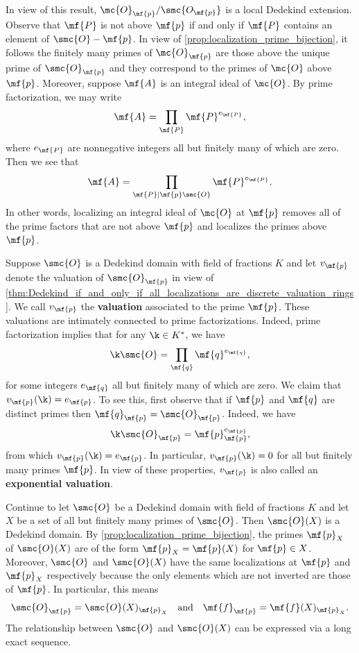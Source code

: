 \documentclass[12pt]{article}
\begin{document}
      In view of this result, \(\mc{O}_{\mf{p}}/\smc{O_{\mf{p}}}\) is a local Dedekind extension. Observe that \(\mf{P}\) is not above \(\mf{p}\) if and only if \(\mf{P}\) contains an element of \(\smc{O}-\mf{p}\). In view of \cref{prop:localization_prime_bijection}, it follows the finitely many primes of \(\mc{O}_{\mf{p}}\) are those above the unique prime of \(\smc{O}_{\mf{p}}\) and they correspond to the primes of \(\mc{O}\) above \(\mf{p}\). Moreover, suppose \(\mf{A}\) is an integral ideal of \(\mc{O}\). By prime factorization, we may write
      \[
        \mf{A} = \prod_{\mf{P}}\mf{P}^{e_{\mf{P}}},
      \]
      where \(e_{\mf{P}}\) are nonnegative integers all but finitely many of which are zero. Then we see that
      \[
        \mf{A} = \prod_{\mf{P} \mid \mf{p}\smc{O}}\mf{P}^{e_{\mf{P}}}.
      \]
      In other words, localizing an integral ideal of \(\mc{O}\) at \(\mf{p}\) removes all of the prime factors that are not above \(\mf{p}\) and localizes the primes above \(\mf{p}\).

      Suppose \(\smc{O}\) is a Dedekind domain with field of fractions \(K\) and let \(v_{\mf{p}}\) denote the valuation of \(\smc{O}_{\mf{p}}\) in view of \cref{thm:Dedekind_if_and_only_if_all_localizations_are_discrete_valuation_rings}. We call \(v_{\mf{p}}\) the \textbf{valuation} associated to the prime \(\mf{p}\). These valuations are intimately connected to prime factorizations. Indeed, prime factorization implies that for any \(\k \in K^{\ast}\), we have
      \[
        \k\smc{O} = \prod_{\mf{q}}\mf{q}^{e_{\mf{q}}},
      \]
      for some integers \(e_{\mf{q}}\) all but finitely many of which are zero. We claim that \(v_{\mf{p}}(\k) = e_{\mf{p}}\). To see this, first observe that if \(\mf{p}\) and \(\mf{q}\) are distinct primes then \(\mf{q}_{\mf{p}} = \smc{O}_{\mf{p}}\). Indeed, we have
      \[
        \k\smc{O}_{\mf{p}} = \mf{p}_{\mf{p}}^{e_{\mf{p}}},
      \]
      from which \(v_{\mf{p}}(\k) = e_{\mf{p}}\). In particular, \(v_{\mf{p}}(\k) = 0\) for all but finitely many primes \(\mf{p}\). In view of these properties, \(v_{\mf{p}}\) is also called an \textbf{exponential valuation}.

      Continue to let \(\smc{O}\) be a Dedekind domain with field of fractions \(K\) and let \(X\) be a set of all but finitely many primes of \(\smc{O}\). Then \(\smc{O}(X)\) is a Dedekind domain. By \cref{prop:localization_prime_bijection}, the primes \(\mf{p}_{X}\) of \(\smc{O}(X)\) are of the form \(\mf{p}_{X} = \mf{p}(X)\) for \(\mf{p} \in X\). Moreover, \(\smc{O}\) and \(\smc{O}(X)\) have the same localizations at \(\mf{p}\) and \(\mf{p}_{X}\) respectively because the only elements which are not inverted are those of \(\mf{p}\). In particular, this means
      \begin{equation}\label{equ:localizing_at_primes_for_X_is_the_same_as_localizing_at_primes} 
        \smc{O}_{\mf{p}} = \smc{O}(X)_{\mf{p}_{X}} \quad \text{and} \quad \mf{f}_{\mf{p}} = \mf{f}(X)_{\mf{p}_{X}}.
      \end{equation}
      The relationship between \(\smc{O}\) and \(\smc{O}(X)\) can be expressed via a long exact sequence.
\end{document}
